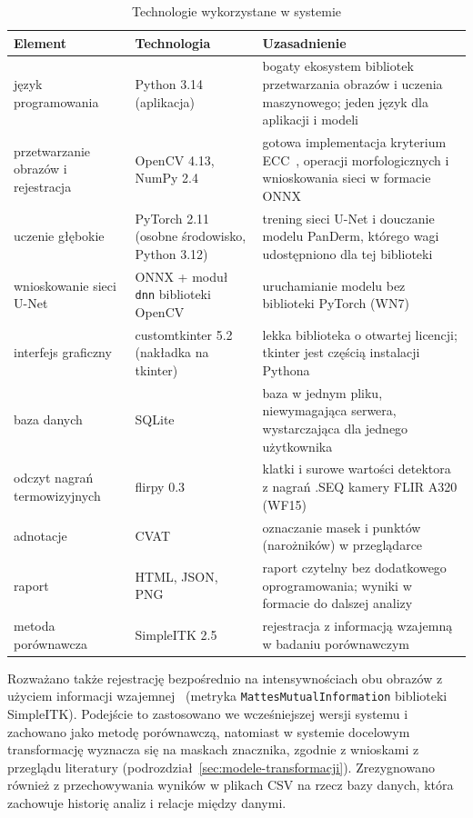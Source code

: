 \begin{table}[htbp]
  \centering
  \caption{Technologie wykorzystane w systemie}
  \label{tab:technologie}
  \small
  \begin{tabularx}{\textwidth}{>{\raggedright\arraybackslash}p{3.0cm} >{\raggedright\arraybackslash}p{3.3cm} X}
    \toprule
    Element & Technologia & Uzasadnienie \\
    \midrule
    język programowania & Python 3.14 (aplikacja) & bogaty ekosystem bibliotek przetwarzania obrazów i uczenia maszynowego; jeden język dla aplikacji i modeli \\
    przetwarzanie obrazów i rejestracja & OpenCV 4.13, NumPy 2.4 & gotowa implementacja kryterium ECC~\cite{evangelidis2008}, operacji morfologicznych i wnioskowania sieci w formacie ONNX \\
    uczenie głębokie & PyTorch 2.11 (osobne środowisko, Python 3.12) & trening sieci U-Net i douczanie modelu PanDerm, którego wagi udostępniono dla tej biblioteki \\
    wnioskowanie sieci U-Net & ONNX + moduł \texttt{dnn} biblioteki OpenCV & uruchamianie modelu bez biblioteki PyTorch (WN7) \\
    interfejs graficzny & customtkinter 5.2 (nakładka na tkinter) & lekka biblioteka o otwartej licencji; tkinter jest częścią instalacji Pythona \\
    baza danych & SQLite & baza w jednym pliku, niewymagająca serwera, wystarczająca dla jednego użytkownika \\
    odczyt nagrań termowizyjnych & flirpy 0.3 & klatki i surowe wartości detektora z nagrań .SEQ kamery FLIR A320 (WF15) \\
    adnotacje & CVAT & oznaczanie masek i punktów (narożników) w przeglądarce \\
    raport & HTML, JSON, PNG & raport czytelny bez dodatkowego oprogramowania; wyniki w formacie do dalszej analizy \\
    metoda porównawcza & SimpleITK 2.5 & rejestracja z informacją wzajemną~\cite{zitova2003} w badaniu porównawczym \\
    \bottomrule
  \end{tabularx}
\end{table}

Rozważano także rejestrację bezpośrednio na intensywnościach obu obrazów z użyciem informacji wzajemnej~\cite{zitova2003,correlation-ratio} (metryka \texttt{MattesMutualInformation} biblioteki SimpleITK). Podejście to zastosowano we wcześniejszej wersji systemu i zachowano jako metodę porównawczą, natomiast w systemie docelowym transformację wyznacza się na maskach znacznika, zgodnie z wnioskami z przeglądu literatury (podrozdział~\ref{sec:modele-transformacji}). Zrezygnowano również z przechowywania wyników w plikach CSV na rzecz bazy danych, która zachowuje historię analiz i relacje między danymi.

